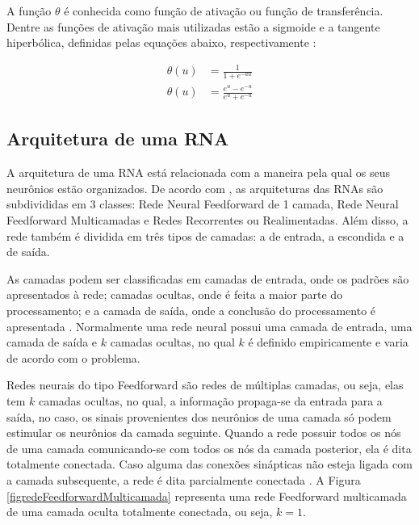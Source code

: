 A função \(\theta\) é conhecida como função de ativação ou função de transferência. Dentre as funções de ativação mais utilizadas estão a sigmoide e a tangente hiperbólica, definidas pelas equações abaixo, respectivamente \cite{articlefunclogtan}:

\begin{equation} \label{eq2}
\begin{split}
\theta(u) & = \frac{1}{1+ e^{-au}}\\
\theta(u) & = \frac{e^u - e^{-u}}{e^u + e^{-u}}
\end{split}
\end{equation}

\subsection{Arquitetura de uma RNA}
\label{subsec:redes-neurais-artificiais:arquitetura}

A arquitetura de uma RNA está relacionada com a maneira pela qual os seus neurônios estão organizados. De acordo com \cite{furtado2019redes}, as arquiteturas das RNAs são subdivididas em 3 classes: Rede Neural Feedforward de 1 camada, Rede Neural Feedforward Multicamadas e Redes Recorrentes ou Realimentadas. Além disso, a rede também é dividida em três tipos de camadas: a de entrada, a escondida e a de saída. 


As camadas podem ser classificadas em camadas de entrada, onde os padrões são apresentados à rede; camadas ocultas, onde é feita a maior parte do processamento; e a camada de saída, onde a conclusão do processamento é apresentada \cite{furtado2019redes}. Normalmente uma rede neural possui uma camada de entrada, uma camada de saída e \(k\) camadas ocultas, no qual \(k\) é definido empiricamente e varia de acordo com o problema.

Redes neurais do tipo Feedforward são redes de múltiplas camadas, ou seja, elas tem \(k\) camadas ocultas, no qual, a informação propaga-se da entrada para a saída, no caso, os sinais provenientes dos neurônios de uma camada só podem estimular os neurônios da camada seguinte. Quando a rede possuir todos os nós de uma camada comunicando-se com todos os nós da camada posterior, ela é dita totalmente conectada. Caso alguma das conexões sinápticas não esteja ligada com a camada subsequente, a rede é dita parcialmente conectada \cite{furtado2019redes}. A Figura \ref{figredeFeedforwardMulticamada} representa uma rede Feedforward multicamada de uma camada oculta totalmente conectada, ou seja, $k=1$.

